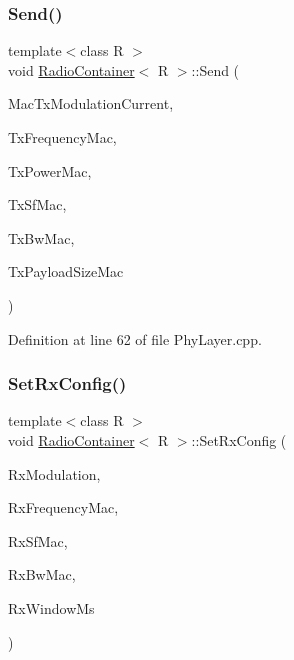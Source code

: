\subsubsection{\texorpdfstring{Send()}{Send()}}
{\footnotesize\ttfamily template$<$class R $>$ \\
void \mbox{\hyperlink{class_radio_container}{Radio\+Container}}$<$ R $>$\+::Send (\begin{DoxyParamCaption}\item[{\mbox{\hyperlink{_define_8h_a81bbaee3ae5a0ec0040b6faedbf80b2f}{e\+Modulation\+Type}}}]{Mac\+Tx\+Modulation\+Current,  }\item[{uint32\+\_\+t}]{Tx\+Frequency\+Mac,  }\item[{uint8\+\_\+t}]{Tx\+Power\+Mac,  }\item[{uint8\+\_\+t}]{Tx\+Sf\+Mac,  }\item[{\mbox{\hyperlink{_define_8h_a6cbb491180e131f374cdbe63880c85e1}{e\+Band\+Width}}}]{Tx\+Bw\+Mac,  }\item[{uint16\+\_\+t}]{Tx\+Payload\+Size\+Mac }\end{DoxyParamCaption})}



Definition at line 62 of file Phy\+Layer.\+cpp.

\mbox{\label{class_radio_container_a2ca1eae7a18c37aefa507b59ad1bcbef}} 
\subsubsection{\texorpdfstring{Set\+Rx\+Config()}{SetRxConfig()}}
{\footnotesize\ttfamily template$<$class R $>$ \\
void \mbox{\hyperlink{class_radio_container}{Radio\+Container}}$<$ R $>$\+::Set\+Rx\+Config (\begin{DoxyParamCaption}\item[{\mbox{\hyperlink{_define_8h_a81bbaee3ae5a0ec0040b6faedbf80b2f}{e\+Modulation\+Type}}}]{Rx\+Modulation,  }\item[{uint32\+\_\+t}]{Rx\+Frequency\+Mac,  }\item[{uint8\+\_\+t}]{Rx\+Sf\+Mac,  }\item[{\mbox{\hyperlink{_define_8h_a6cbb491180e131f374cdbe63880c85e1}{e\+Band\+Width}}}]{Rx\+Bw\+Mac,  }\item[{uint32\+\_\+t}]{Rx\+Window\+Ms }\end{DoxyParamCaption})}



